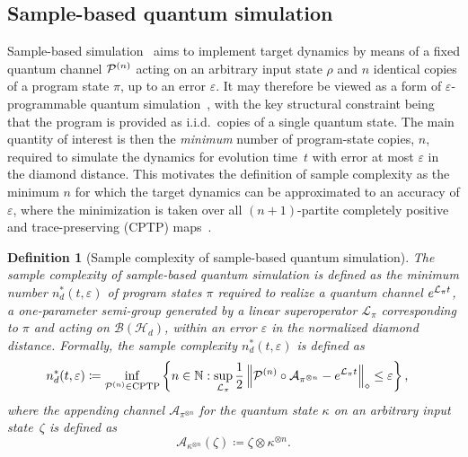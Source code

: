 \documentclass[superscriptaddress,amsmath,amssymb,aps,pra,letterpaper,tightenlines,notitlepages,12pt]{revtex4-2}
\newtheorem{definition}[theorem]{Definition}
\begin{document}
\subsection{Sample-based quantum simulation}

\label{sec:sample-complex-def}

Sample-based simulation~\cite{lloyd2014QuantumPrincipalComponent, kimmel2017HamiltonianSimulationOptimal, wei2024SimulatingNoncompletelyPositive,go2025SamplebasedHamiltonianLindbladian} aims to implement target dynamics by means of a fixed quantum channel ${\cal P}^{(n)}$ acting on an arbitrary input state $\rho$ and $n$ identical copies of a program state $\pi$, up to an error $\varepsilon$. It may therefore be viewed as a form of $\varepsilon$-programmable quantum simulation~\cite{nielsen1997ProgrammableQuantumGate, banchi2020ConvexOptimizationProgrammable, jing2025ProgrammableOpenQuantum}, with the key structural constraint being that the program is provided as i.i.d.\ copies of a single quantum state. The main quantity of interest is then the \textit{minimum} number of program-state copies, $n$, required to simulate the dynamics for evolution time~$t$ with error at most $\varepsilon$ in the diamond distance. This motivates the definition of sample complexity as the minimum $n$ for which the target dynamics can be approximated to an accuracy of $\varepsilon$, where the minimization is taken over all $(n+1)$-partite completely positive and trace-preserving (CPTP) maps~\cite{go2025SamplebasedHamiltonianLindbladian}.



\begin{definition}[Sample complexity of sample-based quantum simulation]
\label{def: sample complexity}
The sample complexity of sample-based quantum simulation is defined as the minimum number $n^{\ast}_d(t,\varepsilon)$ of program states $\pi$ required to realize a quantum channel $e^{{\cal L}_\pi t}$, a one-parameter semi-group generated by a linear superoperator $\mathcal{L}_\pi$ corresponding to $\pi$ and acting on $\mathcal{B}(\mathcal{H}_d)$, within an error $\varepsilon$ in the normalized diamond distance. Formally, the sample complexity $n^{\ast}_d(t,\varepsilon)$ is defined as
\begin{align}
    n^{\ast}_d(t,\varepsilon)
    & \coloneqq  \inf_{\mathcal{P}^{(n)}\in\rm{CPTP}
    }\left\{  n\in\mathbb{N}:\sup_{\mathcal{L}_\pi}\frac{1}{2}\left\Vert \mathcal{P}^{(n)}
    \circ\mathcal{A}_{\pi^{\otimes n}}-e^{\mathcal{L}_\pi t}\right\Vert
    _{\diamond}\leq\varepsilon\right\},
\end{align}
where the appending channel $\mathcal{A}_{\pi^{\otimes n}}$ for the quantum state $\kappa$ on an arbitrary input state~$\zeta$ is defined as
\begin{equation}
\mathcal{A}_{\kappa^{\otimes n}}(\zeta)\coloneqq \zeta\otimes\kappa^{\otimes
n}.
\end{equation}
\end{definition}
\end{document}
